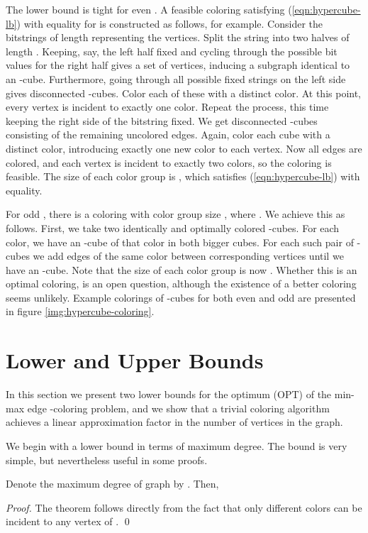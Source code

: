 \documentclass[runningheads, a4paper]{llncs}
\begin{document}
The lower bound is tight for even . A feasible coloring satisfying (\ref{eqn:hypercube-lb}) with equality for  is constructed as follows, for example. Consider the bitstrings of length  representing the vertices. Split the string into two halves of length . Keeping, say, the left half fixed and cycling through the possible bit values for the right half gives a set of  vertices, inducing a subgraph identical to an -cube. Furthermore, going through all possible fixed strings on the left side gives  disconnected -cubes. Color each of these with a distinct color. At this point, every vertex is incident to exactly one color. Repeat the process, this time keeping the right side of the bitstring fixed. We get  disconnected -cubes consisting of the remaining uncolored edges. Again, color each cube with a distinct color, introducing exactly one new color to each vertex. Now all edges are colored, and each vertex is incident to exactly two colors, so the coloring is feasible. The size of each color group is , which satisfies (\ref{eqn:hypercube-lb}) with equality. 

For odd , there is a coloring with color group size , where . We achieve this as follows. First, we take two identically and optimally colored -cubes. For each color, we have an -cube of that color in both bigger cubes. For each such pair of -cubes we add  edges of the same color between corresponding vertices until we have an -cube. Note that the size of each color group is now . Whether this is an optimal coloring, is an open question, although the existence of a better coloring seems unlikely. Example colorings of -cubes for both even and odd  are presented in figure \ref{img:hypercube-coloring}.


\section{Lower and Upper Bounds}\label{sect:lb-ub}

In this section we present two lower bounds for the optimum (OPT) of the min-max edge -coloring problem, and we show that a trivial coloring algorithm achieves a linear approximation factor in the number of vertices in the graph.



We begin with a lower bound in terms of maximum degree. The bound is very simple, but nevertheless useful in some proofs.
\begin{theorem}\label{theorem:max-deg-lb}
Denote the maximum degree of graph  by . Then,

\end{theorem}
\begin{proof}
The theorem follows directly from the fact that only  different colors can be incident to any vertex of . \qed
\end{proof}
\end{document}

